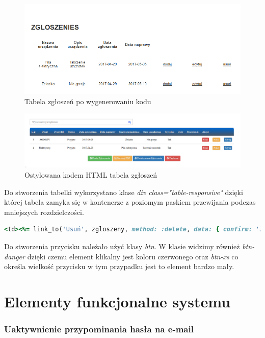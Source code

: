 \documentclass[openright]{xmgr}
\begin{document}
	\begin{figure}[!tbh]
		\centering
		\includegraphics[width=\linewidth]{image/zgloszenie}
		\caption{Tabela zgłoszeń po wygenerowaniu kodu}
	\end{figure}
\newpage	
	\begin{figure}[!tbh]
		\centering
		\includegraphics[width=\linewidth]{image/tabelka}
		\caption{Ostylowana kodem HTML tabela zgłoszeń}
	\end{figure}
	
	Do stworzenia tabelki wykorzystano klase \textit{div class="table-responsive"} dzięki której tabela zamyka się w kontenerze z poziomym paskiem przewijania podczas mniejszych rozdzielczości.
	
	\begin{lstlisting}[language=Ruby,lineskip={-1pt},caption=Element klikalny]
	<td><%= link_to('Usuń', zgloszeny, method: :delete, data: { confirm: 'Jesteś pewny?' }, class:'btn btn-danger btn-xs') %></td>
	\end{lstlisting}
	
	Do stworzenia przycisku należało użyć klasy \textit{btn}. W klasie widzimy również \textit{btn-danger} dzięki czemu element klikalny jest koloru czerwonego oraz \textit{btn-xs} co określa wielkość przycisku w tym przypadku jest to element bardzo mały. 
	
	\chapter{Elementy funkcjonalne systemu}
	
	\subsection{Uaktywnienie przypominania hasła na e-mail}
	
\end{document}
